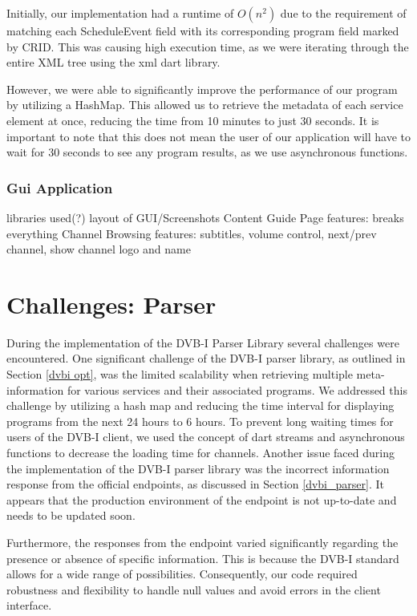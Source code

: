 \documentclass[conference]{IEEEtran}
\begin{document}
Initially, our implementation had a runtime of $O(n^2)$ due to the requirement of matching each ScheduleEvent field with its corresponding program field marked by CRID. This was causing high execution time, as we were iterating through the entire XML tree using the xml dart library.

However, we were able to significantly improve the performance of our program by utilizing a HashMap. This allowed us to retrieve the metadata of each service element at once, reducing the time from 10 minutes to just 30 seconds. It is important to note that this does not mean the user of our application will have to wait for 30 seconds to see any program results, as we use asynchronous functions.







\subsubsection{Gui Application}\label{gui}

libraries used(?)
layout of GUI/Screenshots
Content Guide Page
features: breaks everything 
Channel Browsing
features: subtitles, volume control, next/prev channel, show channel logo and name

\section{Challenges: Parser}


 

During the implementation of the DVB-I Parser Library several challenges were encountered. One significant challenge of the DVB-I parser library, as outlined in Section \ref{dvbi opt}, was the limited scalability when retrieving multiple meta-information for various services and their associated programs. We addressed this challenge by utilizing a hash map and reducing the time interval for displaying programs from the next 24 hours to 6 hours. To prevent long waiting times for users of the DVB-I client, we used the concept of dart streams and asynchronous functions to decrease the loading time for channels.
Another issue faced during the implementation of the DVB-I parser library was the incorrect information response from the official endpoints, as discussed in Section \ref{dvbi_parser}. It appears that the production environment of the endpoint is not up-to-date and needs to be updated soon. 


Furthermore, the responses from the endpoint varied significantly regarding the presence or absence of specific information. This is because the DVB-I standard allows for a wide range of possibilities.
Consequently, our code required robustness and flexibility to handle null values and avoid errors in the client interface.
\end{document}

